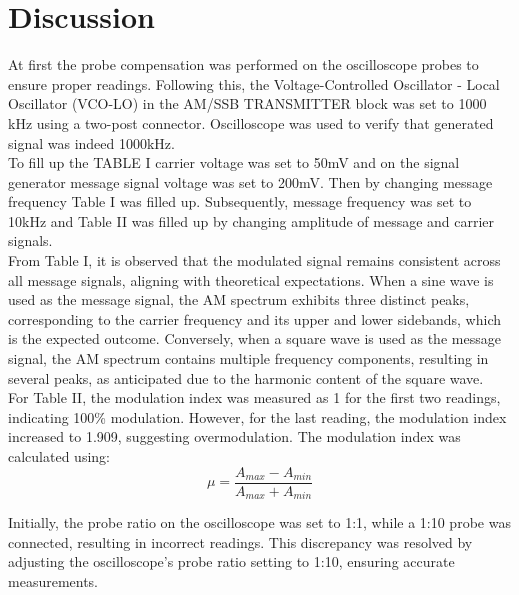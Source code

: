 \newpage
\section*{Discussion}
At first the probe compensation was performed on the oscilloscope probes to ensure proper readings. Following this, the Voltage-Controlled Oscillator - Local Oscillator (VCO-LO) in the AM/SSB TRANSMITTER block was set to 1000 kHz using a two-post connector. Oscilloscope was used to verify that generated signal was indeed 1000kHz. \\
To fill up the TABLE I carrier voltage was set to 50mV and on the signal generator message signal voltage was set to 200mV. Then by changing message frequency Table I was filled up. Subsequently, message frequency was set to 10kHz and Table II was filled up by changing amplitude of message and carrier signals. \\
From Table I, it is observed that the modulated signal remains consistent across all message signals, aligning with theoretical expectations. When a sine wave is used as the message signal, the AM spectrum exhibits three distinct peaks, corresponding to the carrier frequency and its upper and lower sidebands, which is the expected outcome. Conversely, when a square wave is used as the message signal, the AM spectrum contains multiple frequency components, resulting in several peaks, as anticipated due to the harmonic content of the square wave.\\
For Table II, the modulation index was measured as 1 for the first two readings, indicating 100\% modulation. However, for the last reading, the modulation index increased to 1.909, suggesting overmodulation. The modulation index was calculated using: 
\[
    \mu = \frac{A_{max} - A_{min}}{A_{max} + A_{min}}
\]

Initially, the probe ratio on the oscilloscope was set to 1:1, while a 1:10 probe was connected, resulting in incorrect readings. This discrepancy was resolved by adjusting the oscilloscope's probe ratio setting to 1:10, ensuring accurate measurements.

